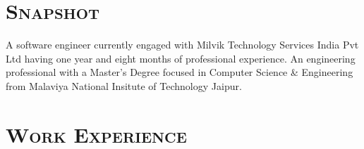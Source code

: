 \documentclass{moderncv}
\begin{document}
\makecvtitle

\section{\textsc{Snapshot}}

\vspace{2pt}

\small{A software engineer currently engaged with Milvik Technology Services India Pvt Ltd having one year and eight months of professional experience. An engineering professional with a Master’s Degree focused in Computer Science \& Engineering from Malaviya National Insitute of Technology Jaipur.}

\vspace{4pt}

\section{\textsc{Work Experience}}
\end{document}
